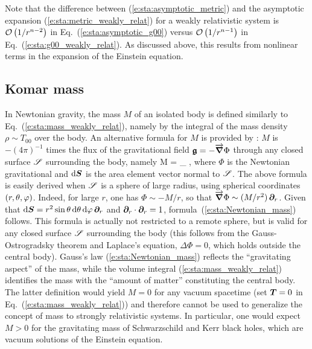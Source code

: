 Note that the difference between (\ref{e:sta:asymptotic_metric})
and the asymptotic expansion (\ref{e:sta:metric_weakly_relat}) for
a weakly relativistic system is
$\mathcal{O}\left( {1}/{r^{n-2}} \right)$ in Eq.~(\ref{e:sta:asymptotic_g00})
versus $\mathcal{O}\left( {1}/{r^{n-1}} \right)$ in Eq.~(\ref{e:sta:g00_weakly_relat}).
As discussed above, this results from nonlinear terms in the expansion of the Einstein equation.


\subsection{Komar mass} \label{s:sta:Komar_mass}

In Newtonian gravity, the mass $M$ of an isolated body is defined
similarly to Eq.~(\ref{e:sta:mass_weakly_relat}), namely by the integral
of the mass density $\rho \sim T_{00}$ over the body. An alternative formula
for $M$ is provided by : $M$ is $-(4\pi)^{-1}$ times the flux of the gravitational field $\bm{\mathfrak{g}} = - \overrightarrow{\bm{\nabla}}\Phi$
through any closed surface $\mathscr{S}$ surrounding the body, namely
\be \label{e:sta:Newtonian_mass}
    M =  \int_{\Sp} \vw{\nabla}{\Phi}\cdot \D {} ,
\ee
where $\Phi$ is the Newtonian gravitational and
$\mathrm{d} \bm{S}$ is the area element vector normal to $\mathscr{S}$. The above formula
is easily derived when $\mathscr{S}$ is a sphere of large radius, using spherical coordinates
$(r,\theta,\varphi)$. Indeed, for large $r$,
one has $\Phi \sim - M/r$, so that $\overrightarrow{\bm{\nabla}}\Phi \sim (M/r^2) \, \bm{\partial}_r$. Given that
$\mathrm{d} \bm{S} = r^2 \sin\theta \, \mathrm{d}\theta\, \mathrm{d}\varphi\, \bm{\partial}_r$ and $\bm{\partial}_r\cdot\bm{\partial}_r = 1$,
formula~(\ref{e:sta:Newtonian_mass}) follows. This formula is
actually not restricted to a remote sphere, but is valid for any closed surface
$\mathscr{S}$ surrounding the body (this follows from the Gauss-Ostrogradsky theorem and Laplace's equation, $\Delta \Phi = 0$, which holds outside the central body).
Gauss's law (\ref{e:sta:Newtonian_mass}) reflects the ``gravitating aspect'' of the mass, while the
volume integral (\ref{e:sta:mass_weakly_relat}) identifies the mass with the ``amount of matter'' constituting
the central body. The latter definition would yield $M=0$ for any vacuum spacetime
(set $\bm{T}=0$ in Eq.~(\ref{e:sta:mass_weakly_relat})) and therefore cannot be used to generalize
the concept of mass to strongly relativistic systems. In  particular, one would expect $M > 0$ for the gravitating mass of Schwarzschild and Kerr black holes, which are vacuum solutions of the Einstein equation.

